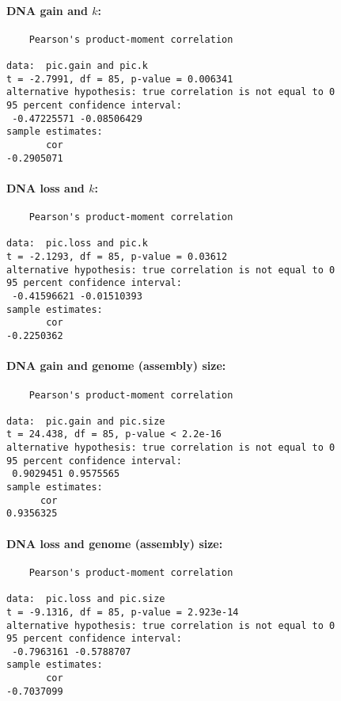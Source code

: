 \clearpage

\paragraph{DNA gain and $k$:}

\begin{verbatim}
	Pearson's product-moment correlation

data:  pic.gain and pic.k
t = -2.7991, df = 85, p-value = 0.006341
alternative hypothesis: true correlation is not equal to 0
95 percent confidence interval:
 -0.47225571 -0.08506429
sample estimates:
       cor 
-0.2905071 
\end{verbatim}

\clearpage

\paragraph{DNA loss and $k$:}

\begin{verbatim}
	Pearson's product-moment correlation

data:  pic.loss and pic.k
t = -2.1293, df = 85, p-value = 0.03612
alternative hypothesis: true correlation is not equal to 0
95 percent confidence interval:
 -0.41596621 -0.01510393
sample estimates:
       cor 
-0.2250362 
\end{verbatim}

\clearpage

\paragraph{DNA gain and genome (assembly) size:}

\begin{verbatim}
	Pearson's product-moment correlation

data:  pic.gain and pic.size
t = 24.438, df = 85, p-value < 2.2e-16
alternative hypothesis: true correlation is not equal to 0
95 percent confidence interval:
 0.9029451 0.9575565
sample estimates:
      cor 
0.9356325 
\end{verbatim}

\clearpage

\paragraph{DNA loss and genome (assembly) size:}

\begin{verbatim}
	Pearson's product-moment correlation

data:  pic.loss and pic.size
t = -9.1316, df = 85, p-value = 2.923e-14
alternative hypothesis: true correlation is not equal to 0
95 percent confidence interval:
 -0.7963161 -0.5788707
sample estimates:
       cor 
-0.7037099 
\end{verbatim}

